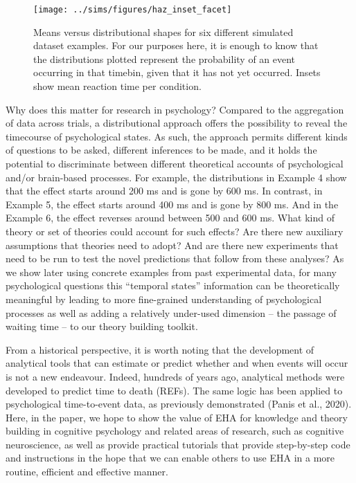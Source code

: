 \documentclass[
  man,floatsintext]{apa6}
\begin{document}
\begin{figure}[H]

{\centering \texttt{[image: ../sims/figures/haz\_inset\_facet]} 

}

\caption{Means versus distributional shapes for six different simulated dataset examples. For our purposes here, it is enough to know that the distributions plotted represent the probability of an event occurring in that timebin, given that it has not yet occurred. Insets show mean reaction time per condition.}\label{fig:plot1}
\end{figure}

Why does this matter for research in psychology? Compared to the aggregation of data across trials, a distributional approach offers the possibility to reveal the timecourse of psychological states. As such, the approach permits different kinds of questions to be asked, different inferences to be made, and it holds the potential to discriminate between different theoretical accounts of psychological and/or brain-based processes.
For example, the distributions in Example 4 show that the effect starts around 200 ms and is gone by 600 ms. In contrast, in Example 5, the effect starts around 400 ms and is gone by 800 ms. And in the Example 6, the effect reverses around between 500 and 600 ms. What kind of theory or set of theories could account for such effects? Are there new auxiliary assumptions that theories need to adopt? And are there new experiments that need to be run to test the novel predictions that follow from these analyses? As we show later using concrete examples from past experimental data, for many psychological questions this ``temporal states'' information can be theoretically meaningful by leading to more fine-grained understanding of psychological processes as well as adding a relatively under-used dimension -- the passage of waiting time -- to our theory building toolkit.

From a historical perspective, it is worth noting that the development of analytical tools that can estimate or predict whether and when events will occur is not a new endeavour.
Indeed, hundreds of years ago, analytical methods were developed to predict time to death (REFs).
The same logic has been applied to psychological time-to-event data, as previously demonstrated (Panis et al., 2020).
Here, in the paper, we hope to show the value of EHA for knowledge and theory building in cognitive psychology and related areas of research, such as cognitive neuroscience, as well as provide practical tutorials that provide step-by-step code and instructions in the hope that we can enable others to use EHA in a more routine, efficient and effective manner.
\end{document}
